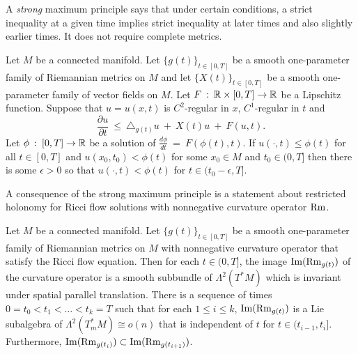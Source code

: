A {\em strong} maximum principle says that under certain conditions,
a strict inequality at a given time implies strict inequality at later
times and also slightly earlier times.  It does not require complete metrics.

\begin{theorem}
  \label{thm:kl-maximum-principles-existence-maximum-principles}

Let $M$ be a connected manifold. Let $\{g(t)\}_{t \in [0,T]}$ be a smooth
one-parameter family of Riemannian metrics on $M$ and let
$\{X(t)\}_{t \in [0, T]}$ be
a smooth one-parameter family of vector fields on $M$. Let $F \: : \:
{\mathbb R} \times [0, T] \rightarrow {\mathbb R}$ be a Lipschitz function.  Suppose that
$u=u(x,t)$ is $C^2$-regular in $x$, $C^1$-regular in $t$ and
\begin{equation}
\frac{\partial u}{\partial t} \: \le \: \triangle_{g(t)} u \: + \: X(t) u \: + \: F(u, t).
\end{equation}
Let $\phi \: : \: [0,T] \rightarrow {\mathbb R}$ be a solution of
$\frac{d\phi}{dt} \: = \: F(\phi(t), t)$. If
$u(\cdot, t) \le \phi(t)$ for all $t \in [0, T]$ and
$u(x_0, t_0) < \phi(t)$ for some $x_0 \in M$ and $t_0 \in (0,T]$ then
there is some $\epsilon > 0$ so that $u(\cdot, t) < \phi(t)$ for
$t \in (t_0 - \epsilon, T]$.
\end{theorem}

A consequence of the strong maximum principle is a statement about
restricted holonomy for Ricci flow solutions with nonnegative curvature
operator $\operatorname{Rm}$.

\begin{theorem}
  \label{thm:kl-maximum-principles-existence-curvature-operators}
 \label{splitting}
Let $M$ be a connected manifold. Let $\{g(t)\}_{t \in [0,T]}$ be a smooth
one-parameter family of Riemannian metrics on $M$ with nonnegative
curvature operator that satisfy the Ricci flow equation.  Then for each $t \in (0, T]$, the
image $\operatorname{Im}(\operatorname{Rm}_{g(t)})$ of the curvature operator
is a smooth subbundle of $\Lambda^2(T^* M)$ which is invariant under
spatial parallel translation. There is a sequence of times
$0 = t_0 < t_1 < \ldots < t_k = T$ such that for each
$1 \le i \le k$,
$\operatorname{Im}(\operatorname{Rm}_{g(t)})$ is a Lie subalgebra of $\Lambda^2(T^*_m M)
\cong o(n)$ that is independent of $t$ for $t \in (t_{i-1}, t_i]$.
Furthermore, $\operatorname{Im}(\operatorname{Rm}_{g(t_i)}) \subset \operatorname{Im}(\operatorname{Rm}_{g(t_{i+1})})$.
\end{theorem}

